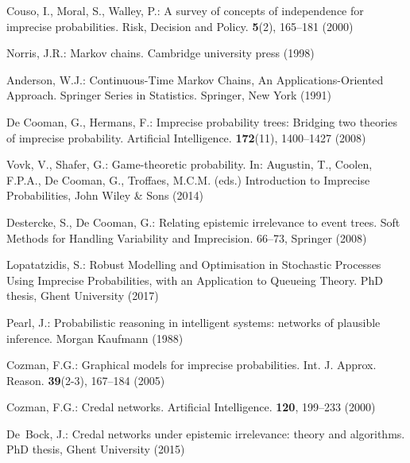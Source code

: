 \begin{thebibliography}{99.}
 Couso, I., Moral, S., Walley, P.: {A survey of concepts of independence for imprecise probabilities}. Risk, Decision and Policy. \textbf{5}(2), 165--181 (2000)


Norris, J.R.: {Markov chains}. Cambridge university press (1998)

Anderson, W.J.: Continuous-Time Markov Chains, An Applications-Oriented Approach. Springer Series in Statistics. Springer, New York (1991)


De Cooman, G., Hermans, F.: {Imprecise probability trees: Bridging two
theories of imprecise probability}. Artificial Intelligence. \textbf{172}(11), 1400--1427 (2008)


Vovk, V., Shafer, G.: {Game-theoretic probability}. 
In: Augustin, T., Coolen, F.P.A., De Cooman, G., Troffaes, M.C.M. (eds.) Introduction to Imprecise Probabilities, {John Wiley \& Sons} (2014) 

Destercke, S., De Cooman, G.: {Relating epistemic irrelevance to event trees}. 
Soft Methods for Handling Variability and Imprecision. 66--73, Springer (2008)

Lopatatzidis, S.: {Robust Modelling and Optimisation in Stochastic Processes Using Imprecise Probabilities, with an Application to Queueing Theory}.
 PhD thesis, Ghent University (2017)


Pearl, J.: {Probabilistic  reasoning  in  intelligent  systems: networks  of  plausible  inference}. Morgan  Kaufmann (1988)

Cozman, F.G.: {Graphical models for imprecise probabilities}.
Int. J. Approx. Reason. \textbf{39}(2-3), 167--184 (2005)

Cozman, F.G.: {Credal networks}. Artificial Intelligence. \textbf{120}, 199--233 (2000)

De~Bock, J.: {Credal networks under epistemic irrelevance: theory and
  algorithms}. PhD thesis, Ghent University (2015)


\end{thebibliography}
